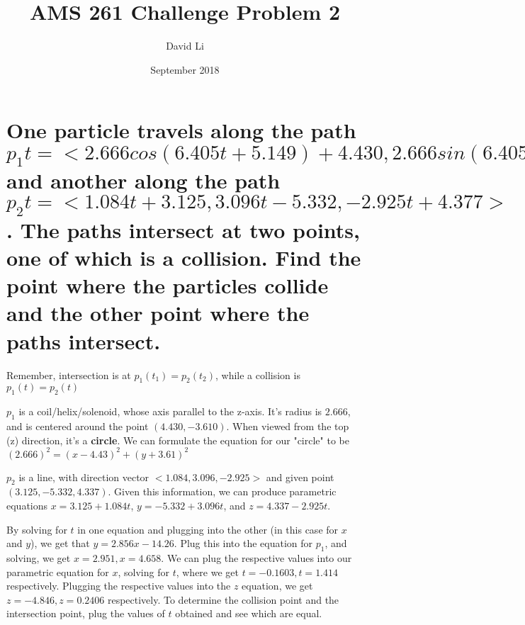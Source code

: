 \documentclass{article}
\title{AMS 261 Challenge Problem 2}
\author{David Li}
\date{September 2018}
\begin{document}
\maketitle

\section{One particle travels along the path $p_{1}t = <2.666cos(6.405t + 5.149) + 4.430, 2.666sin(6.405t + 5.149) - 3.610, 11.18t + 6.633>$ and another along the path $p_2{t} = <1.084t + 3.125, 3.096t - 5.332, -2.925t + 4.377>$.  The paths intersect at two points, one of which is a collision.  Find the point where the particles collide and the other point where the paths intersect.}

\par\noindent\large Remember, intersection is at $p_{1}(t_{1}) = p_{2}(t_{2})$, while a collision is $p_{1}(t) = p_{2}(t)$
\par\noindent $p_{1}$ is a coil/helix/solenoid, whose axis parallel to the z-axis.  It's radius is $2.666$, and is centered around the point $(4.430, -3.610)$.  When viewed from the top (z) direction, it's a \textbf{circle}.  We can formulate the equation for our "circle" to be $(2.666)^{2} = (x - 4.43)^{2} + (y + 3.61)^{2}$ \vspace{0.25cm}

\par\noindent $p_{2}$ is a line, with direction vector $<1.084, 3.096, -2.925>$ and given point $(3.125, -5.332, 4.337)$.  Given this information, we can produce parametric equations $x = 3.125 + 1.084t$, $y = -5.332 + 3.096t$, and $z = 4.337 - 2.925t$.\vspace{0.25cm}

\par\noindent By solving for $t$ in one equation and plugging into the other (in this case for $x$ and $y$), we get that $y = 2.856x - 14.26$.  Plug this into the equation for $p_{1}$, and solving, we get $x = 2.951, x = 4.658$.  We can plug the respective values into our parametric equation for $x$, solving for $t$, where we get $t = -0.1603, t = 1.414$ respectively.  Plugging the respective values into the $z$ equation, we get $z = -4.846, z = 0.2406$ respectively.  To determine the collision point and the intersection point, plug the values of $t$ obtained and see which are equal.
\end{document}

